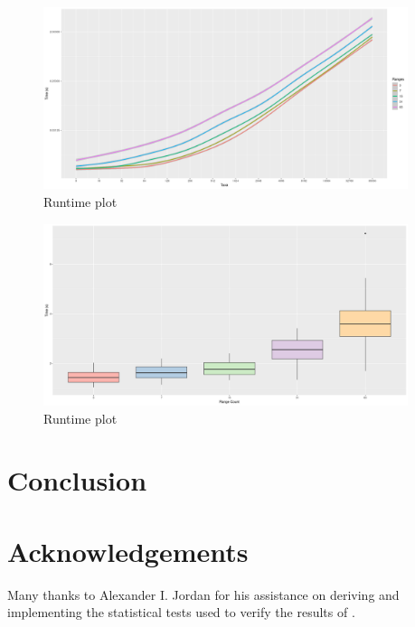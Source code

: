 \documentclass{article}
\begin{document}
\begin{figure}
  \begin{center}
    \includegraphics[width=0.95\textwidth]{figs/bigrig-runtime-taxa-loglog-plot.png}
  \end{center}
  \caption{Runtime plot}\label{fig:runtime-taxa}
\end{figure}

\begin{figure}
  \begin{center}
    \includegraphics[width=0.95\textwidth]{figs/bigrig-runtime-range-time-boxplot.png}
  \end{center}
  \caption{Runtime plot}\label{fig:runtime-regions}
\end{figure}


\section{Conclusion}

\section{Acknowledgements}

Many thanks to Alexander I. Jordan for his assistance on deriving and
implementing the statistical tests used to verify the results of \bigrig{}.


\end{document}
